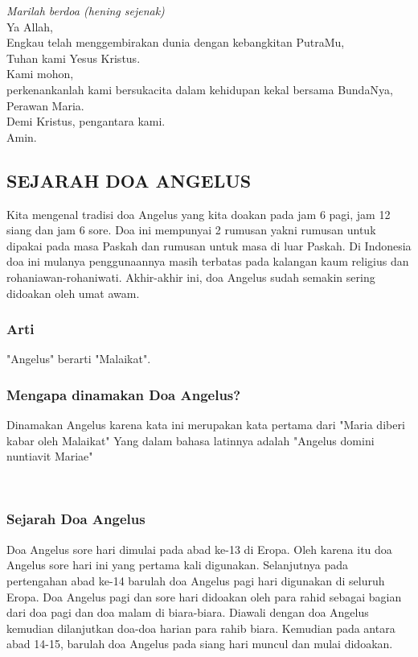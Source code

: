 \emph{Marilah berdoa (hening sejenak)}\\
Ya Allah, \\
Engkau telah menggembirakan dunia dengan kebangkitan PutraMu,\\ 
Tuhan kami Yesus Kristus. \\
Kami mohon, \\
perkenankanlah kami bersukacita dalam kehidupan kekal bersama BundaNya, Perawan Maria. \\
Demi Kristus, pengantara kami. \\
Amin.


\subsection*{SEJARAH DOA ANGELUS}
\scriptsize

Kita mengenal tradisi doa Angelus yang kita doakan pada jam 6 pagi, jam 12 siang dan jam 6 sore.
Doa ini mempunyai 2 rumusan yakni rumusan untuk dipakai pada masa Paskah dan rumusan untuk masa di luar Paskah.
Di Indonesia doa ini mulanya penggunaannya masih terbatas pada kalangan kaum religius dan rohaniawan-rohaniwati.
Akhir-akhir ini, doa Angelus sudah semakin sering didoakan oleh umat awam.

\subsubsection*{Arti}
"Angelus" berarti "Malaikat".

\subsubsection*{Mengapa dinamakan Doa Angelus?}
Dinamakan Angelus karena kata ini merupakan kata pertama dari "Maria diberi kabar oleh Malaikat"
Yang dalam bahasa latinnya adalah "Angelus domini nuntiavit Mariae"

{~}\newpage \thispagestyle{empty}{~} \newpage \thispagestyle{empty}{~} \newpage {~}

\subsubsection*{Sejarah Doa Angelus}
Doa Angelus sore hari dimulai pada abad ke-13 di Eropa.
Oleh karena itu doa Angelus sore hari ini yang pertama kali digunakan.
Selanjutnya pada pertengahan abad ke-14 barulah doa Angelus pagi hari digunakan di seluruh Eropa.
Doa Angelus pagi dan sore hari didoakan oleh para rahid sebagai bagian dari doa pagi dan doa malam di biara-biara.
Diawali dengan doa Angelus kemudian dilanjutkan doa-doa harian para rahib biara.
Kemudian pada antara abad 14-15, barulah doa Angelus pada siang hari muncul dan mulai didoakan.

